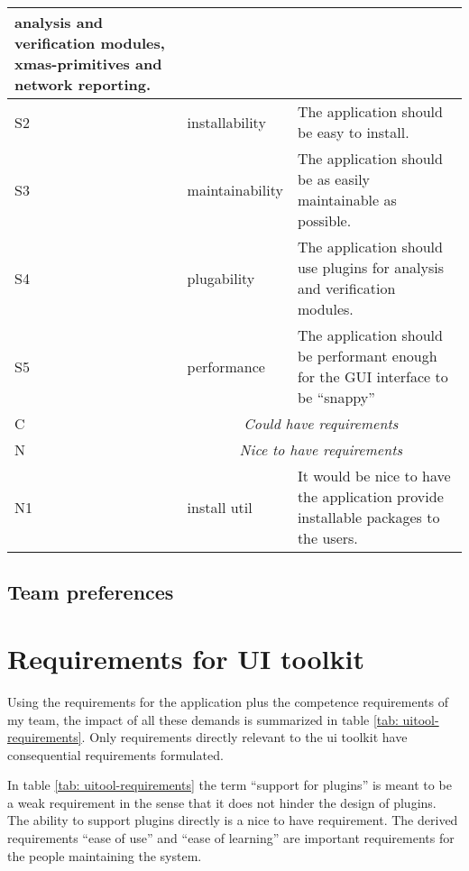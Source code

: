 \begin{center}
\begin{tabular}{|l|p{7em}|p{23em}|}
				analysis and verification modules, xmas-primitives and
				network reporting.
		\\\hline
	S2	& installability & The application should be easy to install.
		\\\hline
	S3	& maintainability & The application should be as easily maintainable as possible.
		\\\hline
	S4	& plugability	& The application should use plugins for analysis and
				verification modules.
		\\\hline
	S5	& performance	& The application should be performant enough for the GUI
				    interface to be ``snappy''
		\\\hline
	C	& \multicolumn{2}{c|}{\sf\emph{\large Could have requirements}}
		\\\hline
	N	& \multicolumn{2}{c|}{\sf\emph{\large Nice to have requirements}}
		\\\hline
	N1	& install util	& It would be nice to have the application provide
				installable packages to the users.
		\\\hline
    \end{tabular}
    \label{tab: appl-requirements}
\end{center}

\subsection{Team preferences}



\section{Requirements for UI toolkit}

Using the requirements for the application plus the competence requirements of
my team, the impact of all these demands is summarized in table \ref{tab:
uitool-requirements}. Only requirements directly relevant to the ui toolkit
have consequential requirements formulated.

In table \ref{tab: uitool-requirements} the term ``support for plugins'' is
meant to be a weak requirement in the sense that it does not hinder the design
of plugins. The ability to support plugins directly is a nice to have
requirement. The derived requirements ``ease of use'' and ``ease of learning''
are important requirements for the people maintaining the system.

